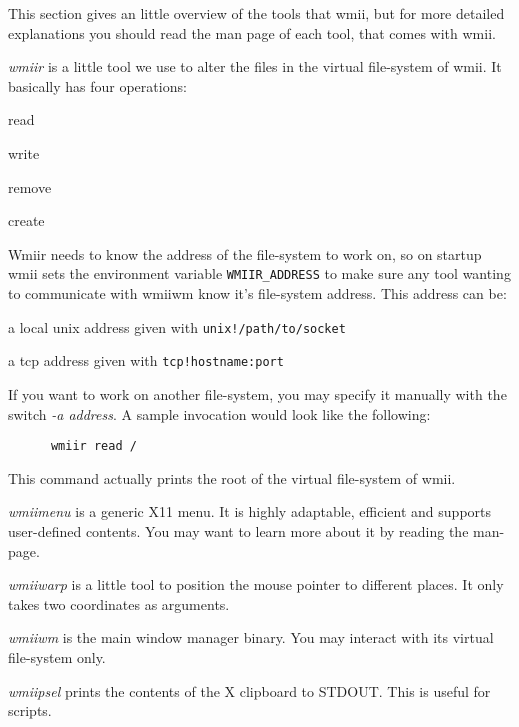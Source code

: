 \documentclass[12pt,a4paper]{article} %
\newenvironment{itemize*}
  {\begin{itemize}
      \setlength{\itemsep}{0pt}
      \setlength{\parskip}{0pt}}
  {\end{itemize}}
\begin{document}
  This section gives an little overview of the tools that wmii, but
  for more detailed explanations you should read the man page of each
  tool, that comes with wmii.
  
  \begin{description}
  
  \item
    \emph{wmiir} is a little tool we use to alter the files in the
    virtual file-system of wmii. It basically has four operations:

    \begin{itemize*}
    \item read
    \item write
    \item remove
    \item create
    \end{itemize*}

    Wmiir needs to know the address of the file-system to work
    on, so on startup wmii sets the environment variable 
    \verb+WMIIR_ADDRESS+ to make sure any tool wanting to
    communicate with wmiiwm know it's file-system address.
    This address can be:
    \begin{itemize*}
      \item a  local unix address given with \verb+unix!/path/to/socket+ 
      \item a tcp address given with \verb+tcp!hostname:port+ 
    \end{itemize*}
    
    If you want to work on another file-system, you may specify it
    manually with the switch \emph{-a  address}. A sample invocation
    would look like the following:
    \begin{verbatim}
      wmiir read /
    \end{verbatim}
    This command actually prints the root of the virtual file-system
    of wmii.

  \item
    \emph{wmiimenu} is a generic X11 menu. It is highly adaptable,
    efficient and supports user-defined contents. You may want to
    learn more about it by reading the man-page.

  \item
    \emph{wmiiwarp} is a little tool to position the mouse pointer to
    different places. It only takes two coordinates as arguments.

  \item
    \emph{wmiiwm} is the main window manager binary. You may interact
    with its virtual file-system only.

  \item
    \emph{wmiipsel} prints the contents of the X clipboard to
    STDOUT. This is useful for scripts.

  \end{description}
\end{document}
